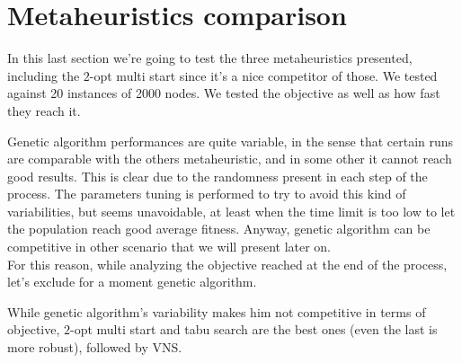 \section{Metaheuristics comparison}
In this last section we're going to test the three metaheuristics presented,
including the $2$-opt multi start since it's a nice competitor of those. We
tested against 20 instances of 2000 nodes. We tested the
objective as well as how fast they reach it.

Genetic algorithm performances are quite variable, in the sense that certain
runs are comparable with the others metaheuristic, and in some other it cannot
reach good results. This is clear due to the randomness present in each step of
the process. The parameters tuning is performed to try to avoid this kind of
variabilities, but seems unavoidable, at least when the time limit is too low to
let the population reach good average fitness. Anyway, genetic algorithm can be
competitive in other scenario that we will present later on.\\
For this reason, while analyzing the objective reached at the end of the
process, let's exclude for a moment genetic algorithm.

\begin{claim}
    While genetic algorithm's variability makes him not competitive in terms of
    objective, $2$-opt multi start and tabu search are the best ones (even the
    last is more robust), followed by VNS.
\end{claim}


